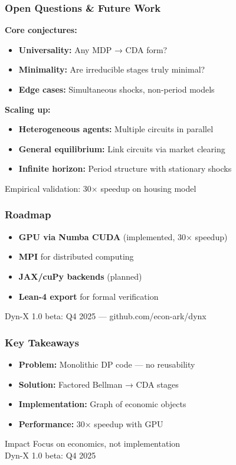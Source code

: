 \documentclass[10pt]{beamer}
\begin{document}
\begin{frame}
  \frametitle{Open Questions \& Future Work}
  
  \textbf{Core conjectures:}
  \begin{itemize}
    \item \textbf{Universality:} Any MDP → CDA form?
    \item \textbf{Minimality:} Are irreducible stages truly minimal?
    \item \textbf{Edge cases:} Simultaneous shocks, non-period models
  \end{itemize}
  
  \textbf{Scaling up:}
  \begin{itemize}
    \item \textbf{Heterogeneous agents:} Multiple circuits in parallel
    \item \textbf{General equilibrium:} Link circuits via market clearing
    \item \textbf{Infinite horizon:} Period structure with stationary shocks
  \end{itemize}
  
  \begin{block}{Empirical validation: 30× speedup on housing model}
  \end{block}
\end{frame}

\begin{frame}
  \frametitle{Roadmap}
  \begin{itemize}
    \item \textbf{GPU via Numba CUDA} (implemented, 30× speedup)
    \item \textbf{MPI} for distributed computing
    \item \textbf{JAX/cuPy backends} (planned)
    \item \textbf{Lean-4 export} for formal verification
  \end{itemize}
  
  \vspace{0.5em}
  \begin{block}{Dyn-X 1.0 beta: Q4 2025 — github.com/econ-ark/dynx}
  \end{block}
\end{frame}

\begin{frame}
  \frametitle{Key Takeaways}
  
  \begin{itemize}
    \item \textbf{Problem:} Monolithic DP code — no reusability
    \item \textbf{Solution:} Factored Bellman → CDA stages
    \item \textbf{Implementation:} Graph of economic objects
    \item \textbf{Performance:} 30× speedup with GPU
  \end{itemize}
  
  \vspace{1em}
  \begin{block}{Impact}
    Focus on economics, not implementation\\
    Dyn-X 1.0 beta: Q4 2025
  \end{block}
\end{frame}
\end{document}
